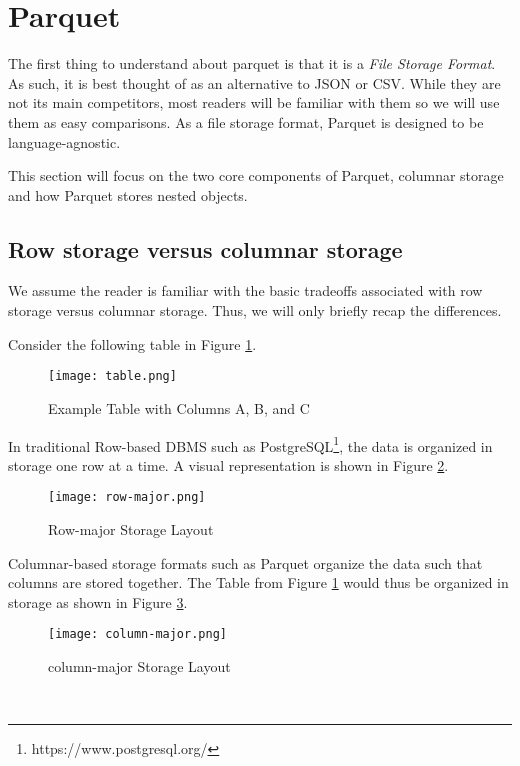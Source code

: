 \section{Parquet} \label{sec:parquet}

The first thing to understand about parquet is that it is a \textit{File Storage Format}.
As such, it is best thought of as an alternative to JSON or CSV.
While they are not its main competitors, most readers will be familiar with them so we will use them as easy comparisons.
As a file storage format, Parquet is designed to be language-agnostic.

This section will focus on the two core components of Parquet, columnar storage and how Parquet stores nested objects.

\subsection{Row storage versus columnar storage}

We assume the reader is familiar with the basic tradeoffs associated with row storage versus columnar storage.
Thus, we will only briefly recap the differences.

Consider the following table in Figure \ref{fig:table}. \\
\begin{figure}[h]
\centering
\texttt{[image: table.png]}
\caption{Example Table with Columns A, B, and C}
\label{fig:table}
\end{figure}

In traditional Row-based DBMS such as PostgreSQL\footnote{https://www.postgresql.org/}, the data is organized in storage one row at a time.
A visual representation is shown in Figure \ref{fig:row-major}. \\
\begin{figure}[h]
\centering
\texttt{[image: row-major.png]}
\caption{Row-major Storage Layout}
\label{fig:row-major}
\end{figure}

Columnar-based storage formats such as Parquet organize the data such that columns are stored together.
The Table from Figure \ref{fig:table} would thus be organized in storage as shown in Figure \ref{fig:column-major}.
\begin{figure}[h]
\centering
\texttt{[image: column-major.png]}
\caption{column-major Storage Layout}
\label{fig:column-major}
\end{figure}
\\

